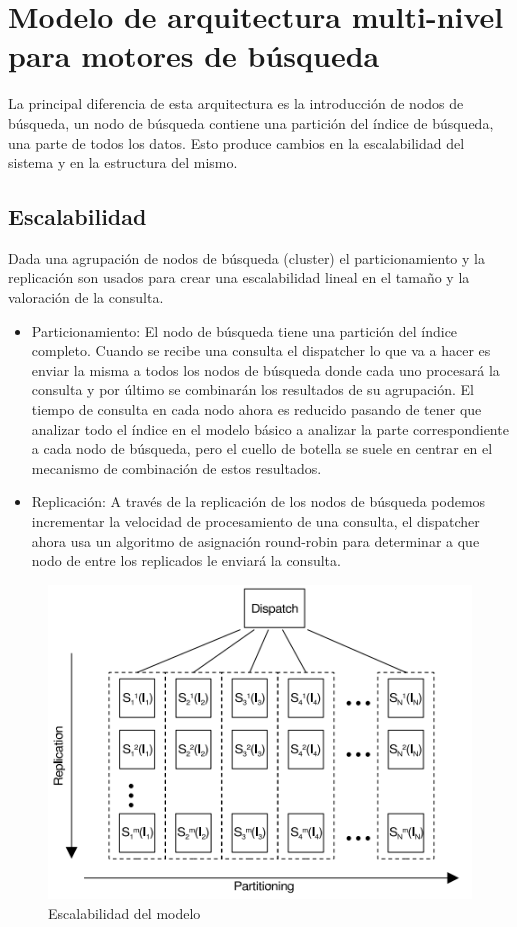 \documentclass[a4paper, 11pt]{article} %
\begin{document}
		\section{Modelo de arquitectura multi-nivel para motores de búsqueda}
		La principal diferencia de esta arquitectura es la introducción de nodos de búsqueda, un nodo de búsqueda contiene una partición del índice de búsqueda, una parte de todos los datos. Esto produce cambios en la escalabilidad del sistema y en la estructura del mismo.
		\subsection{Escalabilidad}
		Dada una agrupación de nodos de búsqueda (cluster) el particionamiento y la replicación son usados para crear una escalabilidad lineal en el tamaño y la valoración de la consulta.
		\begin{itemize}
			\item Particionamiento: El nodo de búsqueda tiene una partición del índice completo. Cuando se recibe una consulta el dispatcher lo que va a hacer es enviar la misma a todos los nodos de búsqueda donde cada uno procesará la consulta y por último se combinarán los resultados de su agrupación. El tiempo de consulta en cada nodo ahora es reducido pasando de tener que analizar todo el índice en el modelo básico a analizar la parte correspondiente a cada nodo de búsqueda, pero el cuello de botella se suele en centrar en el mecanismo de combinación de estos resultados.
			\item Replicación: A través de la replicación de los nodos de búsqueda podemos incrementar la velocidad de procesamiento de una consulta, el dispatcher ahora usa un algoritmo de asignación round-robin para determinar a que nodo de entre los replicados le enviará la consulta.
		\end{itemize}
		\begin{figure}[H]
				\centering
				\includegraphics[scale=0.75]{./img/multitier.png}
				\caption{Escalabilidad del modelo}
				\label{fig:my_label}
		\end{figure}
\end{document}
